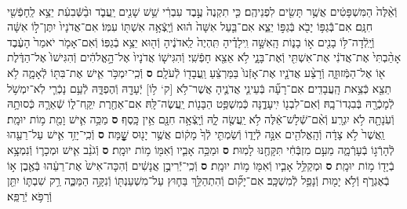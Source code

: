 \documentclass[twoside, openany, parskip=half, 11pt]{book}
\begin{document}
\begin{sometimes}
\begin{footnotesize}
\begin{multicols}{2}
\\
וְֿאֵ֨לֶּה֙ הַמִּשְׁפָּטִ֔ים אֲשֶׁ֥ר תָּשִׂ֖ים לִפְנֵיהֶֽם׃ כִּ֤י תִקְנֶה֙ עֶ֣בֶד עִבְרִ֔י שֵׁ֥שׁ שָׁנִ֖ים יַֽעֲבֹ֑ד וּבַ֨שְּֿׁבִעִ֔ת יֵצֵ֥א לַֽחָפְֿשִׁ֖י חִנָּֽם׃ אִם־בְּֿֿגַפּ֥וֹ יָבֹ֖א בְּֿגַפּ֣וֹ יֵצֵ֑א אִם־בַּ֤עַל אִשָּׁה֙ ה֔וּא וְֿיָֽצְֿאָ֥ה אִשְׁתּ֖וֹ עִמּֽוֹ׃ אִם־אֲדֹנָיו֙ יִתֶּן־ל֣וֹ אִשָּׁ֔ה וְֿיָֽלְֿדָה־לּ֥וֹ בָנִ֖ים א֣וֹ בָנ֑וֹת הָֽאִשָּׁ֣ה וִֽילָדֶ֗יהָ תִּֽהְיֶה֙ לַֽאדֹנֶ֔יהָ וְֿה֖וּא יֵצֵ֥א בְֿגַפּֽוֹ׃ וְֿאִם־אָמֹ֤ר יֹאמַר֙ הָעֶ֔בֶד אָהַ֨בְתִּי֙ אֶת־אֲדֹנִ֔י אֶת־אִשְׁתִּ֖י וְֿאֶת־בָּנָ֑י לֹ֥א אֵצֵ֖א חָפְֿשִֽׁי׃ וְֿהִגִּישׁ֤וֹ אֲדֹנָיו֙ אֶל־הָ֣אֱלֹהִ֔ים וְֿהִגִּישׁוֹ֙ אֶל־הַדֶּ֔לֶת א֖וֹ אֶל־הַמְּֿזוּזָ֑ה וְֿרָצַ֨ע אֲדֹנָ֤יו אֶת־אָזְֿנוֹ֙ בַּמַּרְצֵ֔עַ וַֽעֲבָד֖וֹ לְֿעֹלָֽם׃ \textbf{ס}  וְֿכִֽי־יִמְכֹּ֥ר אִ֛ישׁ אֶת־בִּתּ֖וֹ לְֿאָמָ֑ה לֹ֥א תֵצֵ֖א כְּֿצֵ֥את הָֽעֲבָדִֽים׃ אִם־רָעָ֞ה בְּֿעֵינֵ֧י אֲדֹנֶ֛יהָ אֲשֶׁר־לֹ֥א [ק‘ ל֥וֹ] יְֿעָדָ֖הּ וְֿהֶפְדָּ֑הּ לְֿעַ֥ם נָכְֿרִ֛י לֹֽא־יִמְשֹׁ֥ל לְֿמָכְֿרָ֖הּ בְּֿבִגְדוֹ־בָֽהּ׃ וְֿאִם־לִבְנ֖וֹ יִֽיעָדֶ֑נָּה כְּֿמִשְׁפַּ֥ט הַבָּנ֖וֹת יַֽעֲשֶׂה־לָּֽהּ׃ אִם־אַחֶ֖רֶת יִֽקַּֽח־ל֑וֹ שְֿׁאֵרָ֛הּ כְּֿסוּתָ֥הּ וְֿעֹֽנָתָ֖הּ לֹ֥א יִגְרָֽע׃ וְֿאִ֨ם־שְֿׁלָשׁ־אֵ֔לֶּה לֹ֥א יַֽעֲשֶׂ֖ה לָ֑הּ וְֿיָֽצְֿאָ֥ה חִנָּ֖ם אֵ֥ין כָּֽסֶף׃ \textbf{ס}  מַכֵּ֥ה אִ֛ישׁ וָמֵ֖ת מ֥וֹת יוּמָֽת׃ וַֽאֲשֶׁר֙ לֹ֣א צָדָ֔ה וְֿהָֽאֱלֹהִ֖ים אִנָּ֣ה לְֿיָד֑וֹ וְֿשַׂמְתִּ֤י לְֿךָ֙ מָק֔וֹם אֲשֶׁ֥ר יָנ֖וּס שׇׇׇׇׇׇׇׇָֽׁמָּה׃ \textbf{ס} וְֿכִֽי־יָזִ֥ד אִ֛ישׁ עַל־רֵעֵ֖הוּ לְֿהָרְֿג֣וֹ בְֿעָרְֿמָ֑ה מֵעִ֣ם מִזְבְּֿחִ֔י תִּקָּחֶ֖נּוּ לָמֽוּת׃ \textbf{ס} וּמַכֵּ֥ה אָבִ֛יו וְֿאִמּ֖וֹ מ֥וֹת יוּמָֽת׃ \textbf{ס} וְֿגֹנֵ֨ב אִ֧ישׁ וּמְכָר֛וֹ וְֿנִמְצָ֥א בְֿיָד֖וֹ מ֥וֹת יוּמָֽת׃ \textbf{ס} וּמְקַלֵּ֥ל אָבִ֛יו וְֿאִמּ֖וֹ מ֥וֹת יוּמָֽת׃ \textbf{ס} וְֿכִֽי־יְֿֿרִיבֻ֣ן אֲנָשִׁ֔ים וְֿהִכָּה־אִישׁ֙ אֶת־רֵעֵ֔הוּ בְּֿאֶ֖בֶן א֣וֹ בְֿאֶגְרֹ֑ף וְֿלֹ֥א יָמ֖וּת וְֿנָפַ֥ל לְֿמִשְׁכָּֽב׃ אִם־יָק֞וּם וְֿהִתְהַלֵּ֥ךְ בַּח֛וּץ עַל־מִשְׁעַנְתּ֖וֹ וְֿנִקָּ֣ה הַמַּכֶּ֑ה רַ֥ק שִׁבְתּ֛וֹ יִתֵּ֖ן וְֿרַפֹּ֥א יְֿרַפֵּֽא׃


\end{multicols}
\end{footnotesize}
\end{sometimes}
\end{document}
